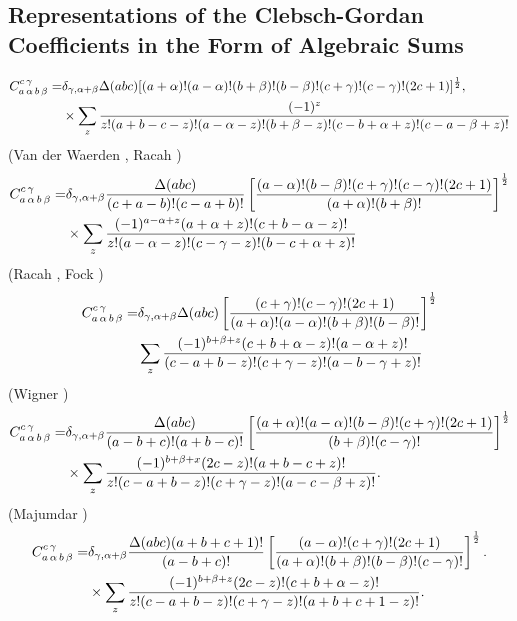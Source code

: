 \subsection{Representations of the Clebsch-Gordan Coefficients in the Form of Algebraic Sums}\label{sec:8.2.1}
\begin{align}
C_{a\,\alpha\,b\,\beta}^{c\,\gamma}= & \delta_{\gamma, \alpha+\beta} \Delta(a b c)[(a+\alpha)!(a-\alpha)!(b+\beta)!(b-\beta)!(c+\gamma)!(c-\gamma)!(2 c+1)]^{\frac{1}{2}}, \notag \\
& \times \sum_{z} \frac{(-1)^{z}}{z!(a+b-c-z)!(a-\alpha-z)!(b+\beta-z)!(c-b+\alpha+z)!(c-a-\beta+z)!}  \label{eq:8:2:3}
\end{align}
(Van der Waerden \cite{ref040}, Racah \cite{ref091}) 
\begin{align}
C_{a\,\alpha\,b\,\beta}^{c\,\gamma}= & \delta_{\gamma, \alpha+\beta} \frac{\Delta(a b c)}{(c+a-b)!(c-a+b)!}\left[\frac{(a-\alpha)!(b-\beta)!(c+\gamma)!(c-\gamma)!(2 c+1)}{(a+\alpha)!(b+\beta)!}\right]^{\frac{1}{2}} \notag \\
& \times \sum_{z} \frac{(-1)^{a-\alpha+z}(a+\alpha+z)!(c+b-\alpha-z)!}{z!(a-\alpha-z)!(c-\gamma-z)!(b-c+\alpha+z)!}  \label{eq:8:2:4}
\end{align}
(Racah \cite{ref091}, Fock \cite{ref068})
\begin{align}
C_{a\,\alpha\,b\,\beta}^{c\,\gamma}=&\delta_{\gamma, \alpha+\beta} \Delta(a b c)\left[\frac{(c+\gamma)!(c-\gamma)!(2 c+1)}{(a+\alpha)!(a-\alpha)!(b+\beta)!(b-\beta)!}\right]^{\frac{1}{2}}\notag \\ &
 \sum_{z} \frac{(-1)^{b+\beta+z}(c+b+\alpha-z)!(a-\alpha+z)!}{(c-a+b-z)!(c+\gamma-z)!(a-b-\gamma+z)!} \label{eq:8:2:5}
\end{align}
(Wigner \cite{ref043})
\begin{align}
C_{a\,\alpha\,b\,\beta}^{c\,\gamma}= & \delta_{\gamma, \alpha+\beta} \frac{\Delta(a b c)}{(a-b+c)!(a+b-c)!}\left[\frac{(a+\alpha)!(a-\alpha)!(b-\beta)!(c+\gamma)!(2 c+1)}{(b+\beta)!(c-\gamma)!}\right]^{\frac{1}{2}}  \notag\\
& \times \sum_{z} \frac{(-1)^{b+\beta+x}(2 c-z)!(a+b-c+z)!}{z!(c-a+b-z)!(c+\gamma-z)!(a-c-\beta+z)!}. \label{eq:8:2:6}
\end{align}
(Majumdar \cite{ref082})
\begin{align}
C_{a\,\alpha\,b\,\beta}^{c\,\gamma}= & \delta_{\gamma, \alpha+\beta} \frac{\Delta(a b c)(a+b+c+1)!}{(a-b+c)!}\left[\frac{(a-\alpha)!(c+\gamma)!(2 c+1)}{(a+\alpha)!(b+\beta)!(b-\beta)!(c-\gamma)!}\right]^{\frac{1}{2}}. \notag\\
& \times \sum_{z} \frac{(-1)^{b+\beta+z}(2 c-z)!(c+b+\alpha-z)!}{z!(c-a+b-z)!(c+\gamma-z)!(a+b+c+1-z)!}. \label{eq:8:2:7}
\end{align}
